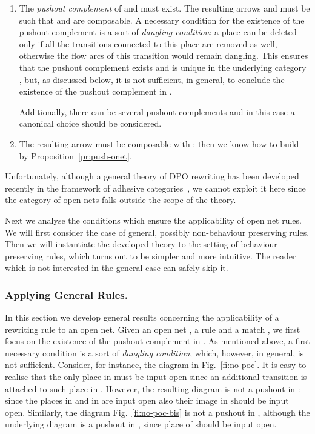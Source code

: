\documentclass{LMCS}
\begin{document}
\begin{enumerate}[]
  
\item The \emph{pushout complement} of  and  must exist. The
  resulting arrows  and  must be such that  and  are
  composable.  A necessary condition for the existence of the pushout
  complement is a sort of \emph{dangling condition}: a place can be
  deleted only if all the transitions connected to this place are
  removed as well, otherwise the flow arcs of this transition would
  remain dangling. This ensures that the pushout complement exists and
  is unique in the underlying category , but, as discussed
  below, it is not sufficient, in general, to conclude the existence
  of the pushout complement in .

  Additionally, there can be several pushout complements and in this case a
  canonical choice should be considered.

\item
  The resulting arrow   must be composable with : then we know
  how to build  by Proposition~\ref{pr:push-onet}.

\end{enumerate}

Unfortunately, although a general theory of DPO
rewriting has been developed recently in the framework of adhesive
categories~\cite{LS:AQC}, we cannot exploit it here
since the category of open nets falls outside the scope of the theory.

Next we analyse the conditions which ensure the applicability of open
net rules. We will first consider the case of general, possibly
non-behaviour preserving rules. Then we will instantiate the developed
theory to the setting of behaviour preserving rules, which turns out to
be simpler and more intuitive. The reader which is not interested in
the general case can safely skip it.

\subsubsection{Applying General Rules.}

In this section we develop general results concerning the
applicability of a rewriting rule to an open net. Given an open net
, a rule  and a match , we first focus on the
existence of the pushout complement in .
As mentioned above, a first necessary condition is a sort of
\emph{dangling condition}, which, however, in general, is not
sufficient.
Consider, for instance, the diagram in Fig.~\ref{fi:no-poc}. It is
easy to realise that the only place in  must be input open since an
additional transition is attached to such place in . However, the
resulting diagram is not a pushout in : since the places in 
and in  are input open also their image in  should be input
open.
Similarly, the diagram Fig.~\ref{fi:no-poc-bis} is not a pushout in
, although the underlying diagram is a pushout in , since
place  of  should be input open.
\end{document}

